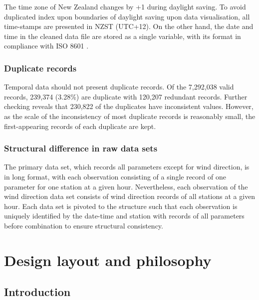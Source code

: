 \documentclass{aucklandthesis}
\begin{document}
The time zone of New Zealand changes by +1 during daylight saving. To avoid duplicated index upon boundaries of daylight saving upon data visualisation, all time-stamps are presented in NZST (UTC+12). On the other hand, the date and time in the cleaned data file are stored as a single variable, with its format in compliance with ISO 8601 \autocite{iso8601,readr}.

\hypertarget{duplicate-records}{%
\subsection{Duplicate records}\label{duplicate-records}}

Temporal data should not present duplicate records. Of the 7,292,038 valid records, 239,374 (3.28\%) are duplicate with 120,207 redundant records. Further checking reveals that 230,822 of the duplicates have inconsistent values. However, as the scale of the inconsistency of most duplicate records is reasonably small, the first-appearing records of each duplicate are kept.

\hypertarget{structural-difference-in-raw-data-sets}{%
\subsection{Structural difference in raw data sets}\label{structural-difference-in-raw-data-sets}}

The primary data set, which records all parameters except for wind direction, is in long format, with each observation consisting of a single record of one parameter for one station at a given hour. Nevertheless, each observation of the wind direction data set consists of wind direction records of all stations at a given hour. Each data set is pivoted to the structure such that each observation is uniquely identified by the date-time and station with records of all parameters before combination to ensure structural consistency.

\hypertarget{ch:design}{%
\chapter{Design layout and philosophy}\label{ch:design}}

\hypertarget{introduction-1}{%
\section{Introduction}\label{introduction-1}}
\end{document}
